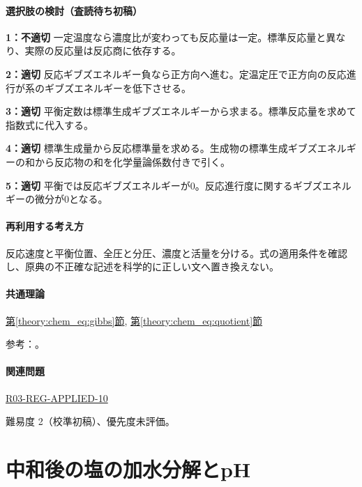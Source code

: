 \paragraph{選択肢の検討（査読待ち初稿）}\mbox{}\par

\noindent\textbf{1：不適切} 一定温度なら濃度比が変わっても反応量は一定。標準反応量と異なり、実際の反応量は反応商に依存する。\par

\noindent\textbf{2：適切} 反応ギブズエネルギー負なら正方向へ進む。定温定圧で正方向の反応進行が系のギブズエネルギーを低下させる。\par

\noindent\textbf{3：適切} 平衡定数は標準生成ギブズエネルギーから求まる。標準反応量を求めて指数式に代入する。\par

\noindent\textbf{4：適切} 標準生成量から反応標準量を求める。生成物の標準生成ギブズエネルギーの和から反応物の和を化学量論係数付きで引く。\par

\noindent\textbf{5：適切} 平衡では反応ギブズエネルギーが0。反応進行度に関するギブズエネルギーの微分が0となる。\par

\paragraph{再利用する考え方} 反応速度と平衡位置、全圧と分圧、濃度と活量を分ける。式の適用条件を確認し、原典の不正確な記述を科学的に正しい文へ置き換えない。

\paragraph{共通理論} \hyperref[theory:chem_eq:gibbs]{第\ref*{theory:chem_eq:gibbs}節}, \hyperref[theory:chem_eq:quotient]{第\ref*{theory:chem_eq:quotient}節}

\par 参考：\cite{iupac_greenbook2012}。

\paragraph{関連問題} \hyperref[q:r03-reg-applied-10]{R03-REG-APPLIED-10}

\par 難易度 2（校準初稿）、優先度未評価。

\section{中和後の塩の加水分解とpH}

